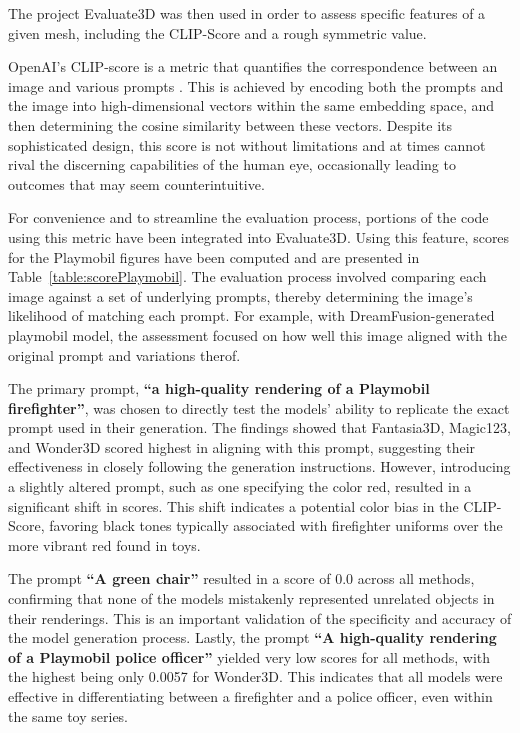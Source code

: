 The project Evaluate3D was then used in order to assess specific features of a given mesh, including the CLIP-Score and a rough symmetric value. 

OpenAI's CLIP-score is a metric that quantifies the correspondence between an image and various prompts \citep{radfordCLIP}. This is achieved by encoding both the prompts and the image into high-dimensional vectors within the same embedding space, and then determining the cosine similarity between these vectors. Despite its sophisticated design, this score is not without limitations and at times cannot rival the discerning capabilities of the human eye, occasionally leading to outcomes that may seem counterintuitive. 

For convenience and to streamline the evaluation process, portions of the code using this metric have been integrated into Evaluate3D. Using this feature, scores for the Playmobil figures have been computed and are presented in Table~\ref{table:scorePlaymobil}. The evaluation process involved comparing each image against a set of underlying prompts, thereby determining the image's likelihood of matching each prompt. For example, with DreamFusion-generated playmobil model, the assessment focused on how well this image aligned with the original prompt and variations therof.

The primary prompt, \textbf{``a high-quality rendering of a Playmobil firefighter''},  was chosen to directly test the models' ability to replicate the exact prompt used in their generation. The findings showed that Fantasia3D, Magic123, and Wonder3D scored highest in aligning with this prompt, suggesting their effectiveness in closely following the generation instructions. However, introducing a slightly altered prompt, such as one specifying the color red, resulted in a significant shift in scores. This shift indicates a potential color bias in the CLIP-Score, favoring black tones typically associated with firefighter uniforms over the more vibrant red found in toys.

The prompt \textbf{``A green chair''} resulted in a score of 0.0 across all methods, confirming that none of the models mistakenly represented unrelated objects in their renderings. This is an important validation of the specificity and accuracy of the model generation process. Lastly, the prompt \textbf{“A high-quality rendering of a Playmobil police officer”} yielded very low scores for all methods, with the highest being only 0.0057 for Wonder3D. This indicates that all models were effective in differentiating between a firefighter and a police officer, even within the same toy series.

